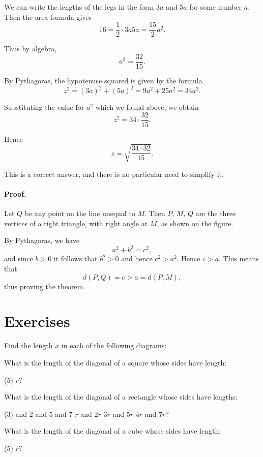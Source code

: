 \documentclass[12pt]{book} %
\begin{document}
We can write the lengths of the legs in the form $3a$ and $5a$ for some number $a$. Then the area formula gives
\[
16=\frac12\cdot 3a 5a=\frac{15}{2}a^2.
\]

Thus by algebra,
\[
a^2=\frac{32}{15}.
\]

By Pythagoras, the hypotenuse squared is given by the formula
\[
z^2=(3a)^2+(5a)^2=9a^2+25a^2=34a^2.
\]

Substituting the value for $a^2$ which we found above, we obtain
\[
z^2=34\cdot \frac{32}{15}.
\]

Hence
\[
z=\sqrt{\frac{34\cdot 32}{15}}.
\]

This is a correct answer, and there is no particular need to simplify it.


\paragraph{Proof.}
Let $Q$ be any point on the line unequal to $M$. Then $P$, $M$, $Q$ are the three vertices of a right triangle, with right angle at $M$, as shown on the figure.


By Pythagoras, we have
\[
a^2+b^2=c^2,
\]
and since $b>0$ it follows that $b^2>0$ and hence $c^2>a^2$. Hence $c>a$. This means that
\[
d(P,Q)=c>a=d(P,M),
\]
thus proving the theorem.

\section*{Exercises}

\begin{ExerciseList}
\Exercise Find the length $x$ in each of the following diagrams:


\Exercise What is the length of the diagonal of a square whose sides have length:
\begin{tasks}(5)
\task[(e)] $r$?
\end{tasks}

\Exercise What is the length of the diagonal of a rectangle whose sides have lengths:
\begin{tasks}(3)
 and 2
 and 5
 and 7
\task[(d)] $r$ and $2r$
\task[(e)] $3r$ and $5r$
\task[(f)] $4r$ and $7r$?
\end{tasks}

\Exercise What is the length of the diagonal of a cube whose sides have length:
\begin{tasks}(5)
\task[(e)] $r$?
\end{tasks}
\end{ExerciseList}
\end{document}

